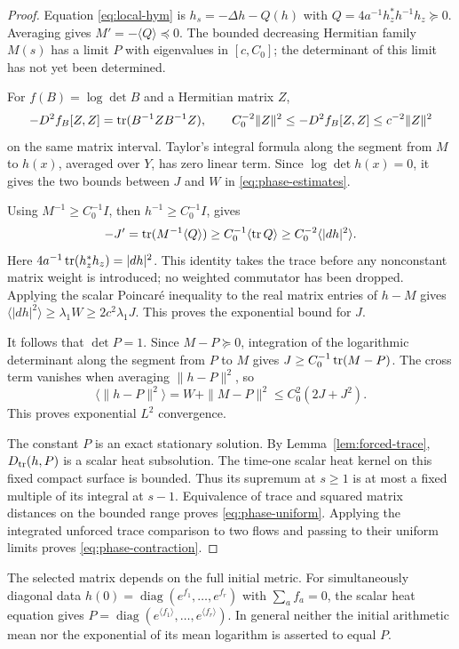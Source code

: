 \begin{proof}
Equation \eqref{eq:local-hym} is $h_s=-\Delta h-Q(h)$ with
$Q=4a^{-1}h_z^*h^{-1}h_z\succeq0$. Averaging gives
$M'=-\langle Q\rangle\preceq0$. The bounded decreasing
Hermitian family $M(s)$ has a limit $P$ with eigenvalues in
$[c,C_0]$; the determinant of this limit has not yet been
determined.

For $f(B)=\log\det B$ and a Hermitian matrix $Z$,
\[
 -D^2f_B[Z,Z]=\operatorname{tr}(B^{-1}ZB^{-1}Z),\qquad
 C_0^{-2}\|Z\|^2\le -D^2f_B[Z,Z]\le c^{-2}\|Z\|^2
\]
on the same matrix interval. Taylor's integral formula along the
segment from $M$ to $h(x)$, averaged over $Y$, has zero linear
term. Since $\log\det h(x)=0$, it gives the two bounds between
$J$ and $W$ in \eqref{eq:phase-estimates}.

Using $M^{-1}\ge C_0^{-1}I$, then $h^{-1}\ge C_0^{-1}I$,
gives
\[
 -J'=\operatorname{tr}(M^{-1}\langle Q\rangle)
       \ge C_0^{-1}\langle\operatorname{tr} Q\rangle
       \ge C_0^{-2}\langle|dh|^2\rangle.
\]
Here $4a^{-1}\operatorname{tr}(h_z^*h_z)=|dh|^2$. This identity takes the
trace before any nonconstant matrix weight is introduced; no
weighted commutator has been dropped. Applying the scalar
Poincar\'e inequality to the real matrix entries of $h-M$
gives $\langle|dh|^2\rangle\ge\lambda_1 W\ge2c^2\lambda_1J$.
This proves the exponential bound for $J$.

It follows that $\det P=1$. Since $M-P\succeq0$,
integration of the logarithmic determinant along the segment
from $P$ to $M$ gives
$J\ge C_0^{-1}\operatorname{tr}(M-P)$. The cross term vanishes when averaging
$\|h-P\|^2$, so
\[
 \langle\|h-P\|^2\rangle
    =W+\|M-P\|^2\le C_0^2(2J+J^2).
\]
This proves exponential $L^2$ convergence.

The constant $P$ is an exact stationary solution. By
Lemma~\ref{lem:forced-trace}, $D_{\operatorname{tr}}(h,P)$ is a scalar heat
subsolution. The time-one scalar heat kernel on this fixed
compact surface is bounded. Thus its supremum at $s\ge1$ is at
most a fixed multiple of its integral at $s-1$. Equivalence of
trace and squared matrix distances on the bounded range proves
\eqref{eq:phase-uniform}. Applying the integrated unforced trace
comparison to two flows and passing to their uniform limits
proves \eqref{eq:phase-contraction}.
\end{proof}

The selected matrix depends on the full initial metric. For
simultaneously diagonal data
$h(0)=\operatorname{diag}(e^{f_1},\ldots,e^{f_r})$ with
$\sum_a f_a=0$, the scalar heat equation gives
$P=\operatorname{diag}(e^{\langle f_1\rangle},\ldots,
e^{\langle f_r\rangle})$. In general neither the initial
arithmetic mean nor the exponential of its mean logarithm is
asserted to equal $P$.

